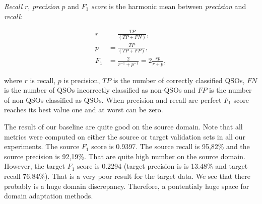 \textit{Recall} \(r\), \textit{precision} \(p\)
and \textit{\(F_1\) score} is the harmonic mean between \textit{precision} and \textit{recall}:

\begin{align}
	r &= \frac{\mathit{TP}}{(\mathit{TP} + \mathit{FN})}, \\
	p &= \frac{\mathit{TP}}{(\mathit{TP} + \mathit{FP})}, \\
	F_1 &= \frac{2}{r^{-1} + p^{-1}} = 2 \frac{r p}{r + p},
\end{align}

where \(r\) is recall, \(p\) is precision,
\(\mathit{TP}\) is the number of correctly classified QSOs,
\(\mathit{FN}\) is the number of QSOs incorrectly classified as non-QSOs
and \(\mathit{FP}\) is the number of non-QSOs classified as QSOs.
When precision and recall are perfect
\(F_1\) score reaches its best value one and at worst can be zero.

The result of our baseline are quite good on the source domain.
Note that all metrics were computed on either the source or target validation sets in all our experiments.
The source \(F_1\) score is 0.9397.
The source recall is 95,82\% and the source precision is 92,19\%.
That are quite high number on the source domain.
However, the target \(F_1\) score is 0.2294 (target precision is is 13.48\% and target recall 76.84\%).
That is a very poor result for the target data.
We see that there probably is a huge domain discrepancy.
Therefore, a pontentialy huge space for domain adaptation methods.

\begin{table}
\begin{center}
\end{center}
\end{table}

